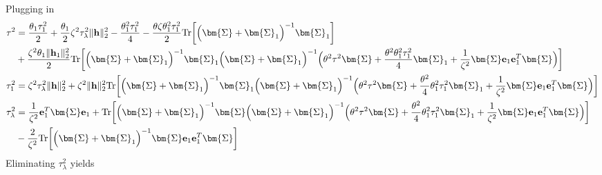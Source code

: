 \documentclass[final]{l4dc2026}
\newcommand{\bSigma}{\bm{\Sigma}}
\newcommand{\be}{\mathbf{e}}
\newcommand{\bh}{\mathbf{h}}
\newcommand{\tr}{\text{Tr}}
\begin{document}
Plugging in
\begin{align*}
    \tau^2 &= \frac{\theta_1 \tau^2_1}{2} + \frac{\theta_1}{2} \zeta^2 \tau_{\lambda}^2 \|\bh\|_2^2 - \frac{\theta_1^2 \tau_1^2}{4} - \frac{\theta \zeta \theta^2_1 \tau_1^2  }{2} \tr\biggl[\Bigl(\bSigma + \bSigma_1 \Bigr)^{-1}\bSigma_1 \biggr] \\
    & + \frac{\zeta^2 \theta_1 \|\bh_1\|_2^2 }{2} \tr \biggl[\Bigl(\bSigma + \bSigma_1 \Bigr)^{-1} \bSigma_1 \Bigl(\bSigma + \bSigma_1 \Bigr)^{-1} \Bigl(\theta^2 \tau^2 \bSigma + \frac{\theta^2  \theta^2_1 \tau_1^2}{4}   \bSigma_1  + \frac{1}{\zeta^2}\bSigma \be_1 \be_1^T \bSigma\Bigr)\biggr]\\
    \tau_1^2 &= \zeta^2 \tau_{\lambda}^2 \|\bh\|_2^2 + \zeta^2 \|\bh\|_2^2\tr\biggl[\Bigl(\bSigma + \bSigma_1 \Bigr)^{-1} \bSigma_1 \Bigl(\bSigma + \bSigma_1 \Bigr)^{-1} \Bigl(\theta^2 \tau^2 \bSigma + \frac{\theta^2}{4}  \theta^2_1 \tau_1^2  \bSigma_1  + \frac{1}{\zeta^2}\bSigma \be_1 \be_1^T \bSigma\Bigr)\biggr] \\
    \tau^2_{\lambda} &=  \frac{1}{\zeta^2} \be_1^T \bSigma \be_1 +\tr \biggl[\Bigl(\bSigma + \bSigma_1 \Bigr)^{-1} \bSigma \Bigl(\bSigma + \bSigma_1 \Bigr)^{-1} \Bigl(\theta^2 \tau^2 \bSigma + \frac{\theta^2}{4}  \theta^2_1 \tau_1^2  \bSigma_1  + \frac{1}{\zeta^2}\bSigma \be_1 \be_1^T \bSigma\Bigr)\biggr] \\ 
     &-\frac{2}{\zeta^2} \tr\biggl[\Bigl(\bSigma + \bSigma_1\Bigr)^{-1}  \bSigma \be_1 \be_1^T \bSigma\biggr]
\end{align*}
Eliminating $\tau_{\lambda}^2$ yields
\end{document}
